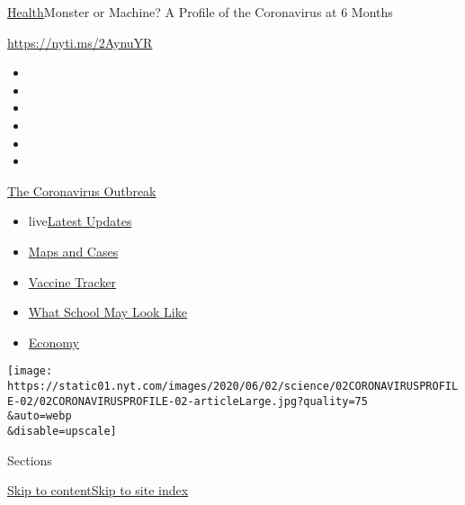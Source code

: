 \href{/section/health}{Health}\textbar{}Monster or Machine? A Profile of
the Coronavirus at 6 Months

\url{https://nyti.ms/2AynuYR}

\begin{itemize}
\item
\item
\item
\item
\item
\item
\end{itemize}

\href{https://www.nytimes.com/news-event/coronavirus?action=click\&pgtype=Article\&state=default\&region=TOP_BANNER\&context=storylines_menu}{The
Coronavirus Outbreak}

\begin{itemize}
\tightlist
\item
  live\href{https://www.nytimes.com/2020/08/01/world/coronavirus-covid-19.html?action=click\&pgtype=Article\&state=default\&region=TOP_BANNER\&context=storylines_menu}{Latest
  Updates}
\item
  \href{https://www.nytimes.com/interactive/2020/us/coronavirus-us-cases.html?action=click\&pgtype=Article\&state=default\&region=TOP_BANNER\&context=storylines_menu}{Maps
  and Cases}
\item
  \href{https://www.nytimes.com/interactive/2020/science/coronavirus-vaccine-tracker.html?action=click\&pgtype=Article\&state=default\&region=TOP_BANNER\&context=storylines_menu}{Vaccine
  Tracker}
\item
  \href{https://www.nytimes.com/interactive/2020/07/29/us/schools-reopening-coronavirus.html?action=click\&pgtype=Article\&state=default\&region=TOP_BANNER\&context=storylines_menu}{What
  School May Look Like}
\item
  \href{https://www.nytimes.com/live/2020/07/31/business/stock-market-today-coronavirus?action=click\&pgtype=Article\&state=default\&region=TOP_BANNER\&context=storylines_menu}{Economy}
\end{itemize}

\texttt{[image: https://static01.nyt.com/images/2020/06/02/science/02CORONAVIRUSPROFILE-02/02CORONAVIRUSPROFILE-02-articleLarge.jpg?quality=75\\\&auto=webp\\\&disable=upscale]}

Sections

\protect\hyperlink{site-content}{Skip to
content}\protect\hyperlink{site-index}{Skip to site index}

